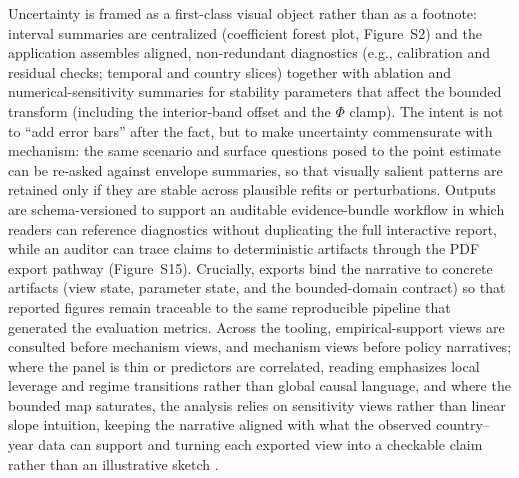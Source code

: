 \documentclass[11pt]{article}
\begin{document}
Uncertainty is framed as a first-class visual object rather than as a footnote: interval summaries are centralized (coefficient forest plot, Figure~S2) and the application assembles aligned, non-redundant diagnostics (e.g., calibration and residual checks; temporal and country slices) together with ablation and numerical-sensitivity summaries for stability parameters that affect the bounded transform (including the interior-band offset and the $\Phi$ clamp). The intent is not to ``add error bars'' after the fact, but to make uncertainty commensurate with mechanism: the same scenario and surface questions posed to the point estimate can be re-asked against envelope summaries, so that visually salient patterns are retained only if they are stable across plausible refits or perturbations. Outputs are schema-versioned to support an auditable evidence-bundle workflow in which readers can reference diagnostics without duplicating the full interactive report, while an auditor can trace claims to deterministic artifacts through the PDF export pathway (Figure~S15). Crucially, exports bind the narrative to concrete artifacts (view state, parameter state, and the bounded-domain contract) so that reported figures remain traceable to the same reproducible pipeline that generated the evaluation metrics. Across the tooling, empirical-support views are consulted before mechanism views, and mechanism views before policy narratives; where the panel is thin or predictors are correlated, reading emphasizes local leverage and regime transitions rather than global causal language, and where the bounded map saturates, the analysis relies on sensitivity views rather than linear slope intuition, keeping the narrative aligned with what the observed country--year data can support and turning each exported view into a checkable claim rather than an illustrative sketch \parencite{Keim2010MasteringVisualAnalytics,MacEachren2005VisualizingUncertainty,Peng2011Reproducible}.

\end{document}
